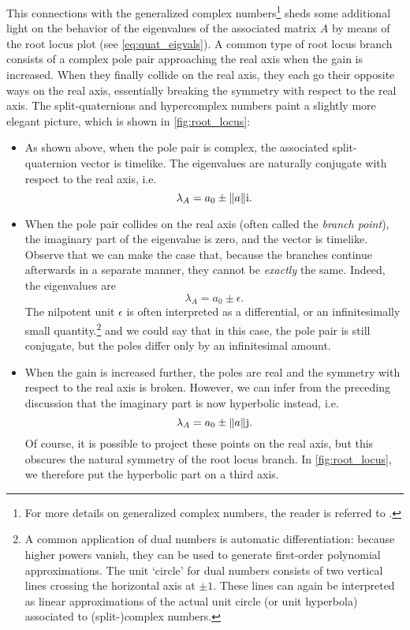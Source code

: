 This connections with the generalized complex numbers\footnote
{For more details on generalized complex numbers, the reader is referred to \citet{Harkin2004}.}
sheds some additional light on the behavior of the eigenvalues of the associated matrix $A$ by means of the root locus plot (see \cref{eq:quat_eigvals}). A common type of root locus branch consists of a complex pole pair approaching the real axis when the gain is increased. When they finally collide on the real axis, they each go their opposite ways on the real axis, essentially breaking the symmetry with respect to the real axis. The split-quaternions and hypercomplex numbers paint a slightly more elegant picture, which is shown in \cref{fig:root_locus}:
\begin{itemize}
    \item As shown above, when the pole pair is complex, the associated split-quaternion vector is timelike. The eigenvalues are naturally conjugate with respect to the real axis, i.e.
        $$ \lambda_A = a_0 \pm \norm{a}\mathrm{i}.$$
    \item When the pole pair collides on the real axis (often called the \emph{branch point}), the imaginary part of the eigenvalue is zero, and the vector is timelike. Observe that we can make the case that, because the branches continue afterwards in a separate manner, they cannot be \emph{exactly} the same. Indeed, the eigenvalues are
        $$ \lambda_A = a_0 \pm \epsilon.$$
    The nilpotent unit $\epsilon$ is often interpreted as a differential, or an infinitesimally small quantity.\footnote{A common application of dual numbers is automatic differentiation: because higher powers vanish, they can be used to generate first-order polynomial approximations. The unit `circle' for dual numbers consists of two vertical lines crossing the horizontal axis at $\pm 1$. These lines can again be interpreted as linear approximations of the actual unit circle (or unit hyperbola) associated to (split-)complex numbers.} and we could say that in this case, the pole pair is still conjugate, but the poles differ only by an infinitesimal amount.
    \item When the gain is increased further, the poles are real and the symmetry with respect to the real axis is broken. However, we can infer from the preceding discussion that the imaginary part is now hyperbolic instead, i.e.
        $$ \lambda_A = a_0 \pm \norm{a}\mathrm{j}. $$
        Of course, it is possible to project these points on the real axis, but this obscures the natural symmetry of the root locus branch. In \cref{fig:root_locus}, we therefore put the hyperbolic part on a third axis.
\end{itemize}

